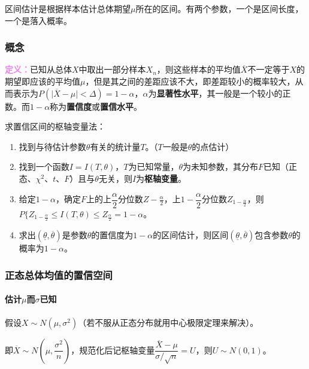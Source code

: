 区间估计是根据样本估计总体期望$\mu$所在的区间。有两个参数，一个是区间长度，一个是落入概率。

\subsubsection{概念}

\textcolor{violet}{\textbf{定义：}}已知从总体$X$中取出一部分样本$X_n$，则这些样本的平均值$\overline{X}$不一定等于$X$的期望即应该的平均值$\mu$，但是其之间的差距应该不大，即差距较小的概率较大，从而表示为$P(\vert\overline{X}-\mu\vert<\Delta)=1-\alpha$，$\alpha$为\textbf{显著性水平}，其一般是一个较小的正数。而$1-\alpha$称为\textbf{置信度}或\textbf{置信水平}。

求置信区间的枢轴变量法：

\begin{enumerate}
    \item 找到与待估计参数$\theta$有关的统计量$T$。（$T$一般是$\theta$的点估计）
    \item 找到一个函数$I=I(T,\theta)$，$T$为已知常量，$\theta$为未知参数，其分布$F$已知（正态、$\chi^2$、$t$、$F$）且与$\theta$无关，则$I$为\textbf{枢轴变量}。
    \item 给定$1-\alpha$，确定$F$上的上$\dfrac{\alpha}{2}$分位数$Z-{\frac{\alpha}{2}}$，上$1-\dfrac{\alpha}{2}$分位数$Z_{1-\frac{\alpha}{2}}$，则$P\{Z_{1-\frac{\alpha}{2}}\leqslant I(T,\theta)\leqslant Z_{\frac{\alpha}{2}}=1-\alpha$。
    \item 求出$(\underline{\theta},\overline{\theta})$是参数$\theta$的置信度为$1-\alpha$的区间估计，则区间$(\underline{\theta},\overline{\theta})$包含参数$\theta$的概率为$1-\alpha$。
\end{enumerate}

\subsubsection{正态总体均值的置信空间}

\paragraph{\texorpdfstring{估计$\mu$而$\sigma$已知}{}} \leavevmode \medskip

假设$X\sim N(\mu,\sigma^2)$（若不服从正态分布就用中心极限定理来解决）。

即$\overline{X}\sim N\left(\mu,\dfrac{\sigma^2}{n}\right)$，规范化后记枢轴变量$\dfrac{\overline{X}-\mu}{\sigma/\sqrt{n}}=U$，则$U\sim N(0,1)$。

